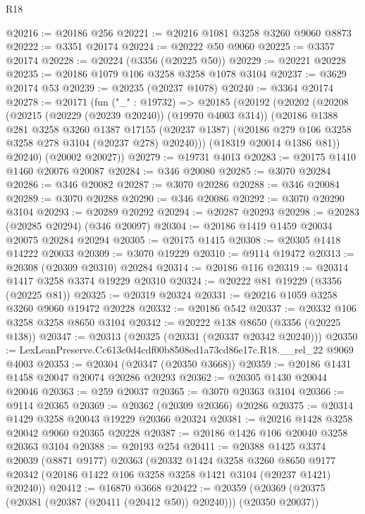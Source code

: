 \begin{lexlean}{R18}
\begin{coremodule}
@20216 := @20186 @256
@20221 := @20216 @1081 @3258 @3260 @9060 @8873
@20222 := @3351 @20174
@20224 := @20222 @50 @9060
@20225 := @3357 @20174
@20228 := @20224 (@3356 (@20225 @50))
@20229 := @20221 @20228
@20235 := @20186 @1079 @106 @3258 @3258 @1078 @3104
@20237 := @3629 @20174 @53
@20239 := @20235 (@20237 @1078)
@20240 := @3364 @20174
@20278 := @20171
    (fun ("_" : @19732) =>
    @20185
      (@20192
        (@20202
          (@20208
            (@20215 (@20229 (@20239 @20240)) (@19970 @4003 @314))
            (@20186
              @1388
              @281
              @3258
              @3260
              @1387
              @17155
              (@20237 @1387)
              (@20186 @279 @106 @3258 @3258 @278 @3104 (@20237 @278) @20240)))
          (@18319 @20014 @1386 @81))
        @20240)
      (@20002 @20027))
@20279 := @19731 @4013
@20283 := @20175 @1410 @1460 @20076 @20087
@20284 := @346 @20080
@20285 := @3070 @20284
@20286 := @346 @20082
@20287 := @3070 @20286
@20288 := @346 @20084
@20289 := @3070 @20288
@20290 := @346 @20086
@20292 := @3070 @20290 @3104
@20293 := @20289 @20292
@20294 := @20287 @20293
@20298 := @20283 (@20285 @20294) (@346 @20097)
@20304 := @20186 @1419 @1459 @20034 @20075 @20284 @20294
@20305 := @20175 @1415
@20308 := @20305 @1418 @14222 @20033
@20309 := @3070 @19229
@20310 := @9114 @19472
@20313 := @20308 (@20309 @20310) @20284
@20314 := @20186 @116
@20319 := @20314 @1417 @3258 @3374 @19229 @20310
@20324 := @20222 @81 @19229 (@3356 (@20225 @81))
@20325 := @20319 @20324
@20331 := @20216 @1059 @3258 @3260 @9060 @19472 @20228
@20332 := @20186 @542
@20337 := @20332 @106 @3258 @3258 @8650 @3104
@20342 := @20222 @138 @8650 (@3356 (@20225 @138))
@20347 := @20313 (@20325 (@20331 (@20337 @20342 @20240)))
@20350 := LexLeanPreserve.Cc613c0d4cdf00b8508ed1a73cd86e17c.R18.__rel_22 @9069 @4003
@20353 := @20304 (@20347 (@20350 @3668))
@20359 := @20186 @1431 @1458 @20047 @20074 @20286 @20293
@20362 := @20305 @1430 @20044 @20046
@20363 := @259 @20037
@20365 := @3070 @20363 @3104
@20366 := @9114 @20365
@20369 := @20362 (@20309 @20366) @20286
@20375 := @20314 @1429 @3258 @20043 @19229 @20366 @20324
@20381 := @20216 @1428 @3258 @20042 @9060 @20365 @20228
@20387 := @20186 @1426 @106 @20040 @3258 @20363 @3104
@20388 := @20193 @254
@20411 := @20388
    @1425
    @3374
    @20039
    (@8871 @9177)
    @20363
    (@20332
      @1424
      @3258
      @3260
      @8650
      @9177
      @20342
      (@20186 @1422 @106 @3258 @3258 @1421 @3104 (@20237 @1421) @20240))
@20412 := @16870 @3668
@20422 := @20359 (@20369 (@20375 (@20381 (@20387 (@20411 (@20412 @50)) @20240))) (@20350 @20037))

\end{coremodule}
\end{lexlean}

